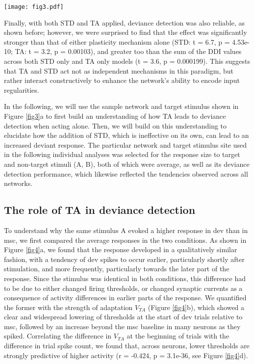 \documentclass[pdflatex,referee,iicol,sn-basic]{sn-jnl}
\theoremstyle{thmstyleone}%
\theoremstyle{thmstyletwo}%
\theoremstyle{thmstylethree}%
\begin{document}
\begin{figure*}%
    \centering
    \texttt{[image: fig3.pdf]}
    \caption{Deviance detection and SSA indices under model ablation. \textbf{a} Sample network responses to target stimulation, with the deviance detection index in each instance noted in the plot titles. \textbf{b, c} Deviance detection and SSA indices across networks and stimulus pairs. Significance was assessed by 1-sample t-tests. TODO p-values: text or table?}
    \label{fig3}
\end{figure*}

Finally, with both STD and TA applied, deviance detection was also reliable, as shown before; however, we were surprised to find that the effect was significantly stronger than that of either plasticity mechanism alone (STD: t = 6.7, p = 4.53e-10; TA: t = 3.2, p = 0.00103), and greater too than the sum of the DDI values across both STD only and TA only models (t = 3.6, p = 0.000199). This suggests that TA and STD act not as independent mechanisms in this paradigm, but rather interact constructively to enhance the network's ability to encode input regularities.

In the following, we will use the sample network and target stimulus shown in Figure \ref{fig3}a to first build an understanding of how TA leads to deviance detection when acting alone. Then, we will build on this understanding to elucidate how the addition of STD, which is ineffective on its own, can lead to an increased deviant response. The particular network and target stimulus site used in the following individual analyses was selected for the response size to target and non-target stimuli (A, B), both of which were average, as well as its deviance detection performance, which likewise reflected the tendencies observed across all networks.

\subsection{The role of TA in deviance detection}\label{sec-ta}

To understand why the same stimulus A evoked a higher response in dev than in msc, we first compared the average responses in the two conditions. As shown in Figure \ref{fig4}a, we found that the response developed in a qualitatively similar fashion, with a tendency of dev spikes to occur earlier, particularly shortly after stimulation, and more frequently, particularly towards the later part of the response. Since the stimulus was identical in both conditions, this difference had to be due to either changed firing thresholds, or changed synaptic currents as a consequence of activity differences in earlier parts of the response. We quantified the former with the strength of adaptation $V_{TA}$ (Figure \ref{fig4}b), which showed a clear and widespread lowering of thresholds at the start of dev trials relative to msc, followed by an increase beyond the msc baseline in many neurons as they spiked. Correlating the difference in $V_{TA}$ at the beginning of trials with the difference in trial spike count, we found that, across neurons, lower thresholds are strongly predictive of higher activity (r = -0.424, p = 3.1e-36, see Figure \ref{fig4}d).
\end{document}
